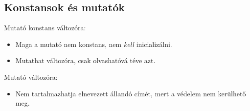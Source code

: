 \documentclass[usenames,dvipsnames,aspectratio=169]{beamer}
\begin{document}
\begin{frame}
    \begin{exampleblock}{}
        \scriptsize
        
    \end{exampleblock}
\end{frame}

\begin{frame}
    \begin{exampleblock}{}
        \scriptsize
        
    \end{exampleblock}
\end{frame}


\subsection{Konstansok és mutatók}

\begin{frame}
    Mutató konstans változóra:
    \begin{itemize}
        \item Maga a mutató nem konstans, nem \emph{kell} inicializálni.
        \item Mutathat változóra, csak olvashatóvá téve azt.
    \end{itemize}
    \begin{exampleblock}{}
        \scriptsize
        
    \end{exampleblock}
\end{frame}

\begin{frame}
    Mutató változóra:
    \begin{itemize}
        \item Nem tartalmazhatja elnevezett állandó címét, mert a védelem nem kerülhető meg.
    \end{itemize}
    \begin{exampleblock}{}
        \scriptsize
        
    \end{exampleblock}
\end{frame}
\end{document}
